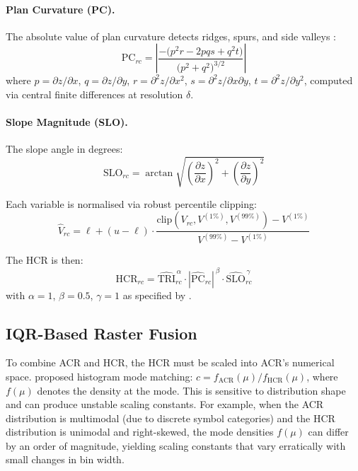 \documentclass[11pt,a4paper]{article}
\begin{document}
\paragraph{Plan Curvature (PC).}
The absolute value of plan curvature detects ridges, spurs, and side valleys \citep{zevenbergen1987}:
\begin{equation}
  \text{PC}_{rc} = \left| \frac{-\bigl(p^2 r - 2pqs + q^2 t\bigr)}{\bigl(p^2 + q^2\bigr)^{3/2}} \right|
  \label{eq:pc}
\end{equation}
where $p = \partial z / \partial x$, $q = \partial z / \partial y$, $r = \partial^2 z / \partial x^2$, $s = \partial^2 z / \partial x \partial y$, $t = \partial^2 z / \partial y^2$, computed via central finite differences at resolution $\delta$.

\paragraph{Slope Magnitude (SLO).}
The slope angle in degrees:
\begin{equation}
  \text{SLO}_{rc} = \arctan\!\sqrt{\left(\frac{\partial z}{\partial x}\right)^2 + \left(\frac{\partial z}{\partial y}\right)^2}
  \label{eq:slo}
\end{equation}

Each variable is normalised via robust percentile clipping:
\begin{equation}
  \hat{V}_{rc} = \ell + (u - \ell) \cdot \frac{\text{clip}(V_{rc}, V^{(1\%)}, V^{(99\%)}) - V^{(1\%)}}{V^{(99\%)} - V^{(1\%)}}
  \label{eq:norm}
\end{equation}

The HCR is then:
\begin{equation}
  \text{HCR}_{rc} = \widehat{\text{TRI}}_{rc}^{\,\alpha} \cdot |\widehat{\text{PC}}_{rc}|^{\,\beta} \cdot \widehat{\text{SLO}}_{rc}^{\,\gamma}
  \label{eq:hcr}
\end{equation}
with $\alpha = 1$, $\beta = 0.5$, $\gamma = 1$ as specified by \citet{ica2021lcp}.

\subsection{IQR-Based Raster Fusion}
\label{sec:iqr}

To combine ACR and HCR, the HCR must be scaled into ACR's numerical space.
\citet{ica2021lcp} proposed histogram mode matching: $c = f_{\text{ACR}}(\mu) / f_{\text{HCR}}(\mu)$, where $f(\mu)$ denotes the density at the mode.
This is sensitive to distribution shape and can produce unstable scaling constants.
For example, when the ACR distribution is multimodal (due to discrete symbol categories) and the HCR distribution is unimodal and right-skewed, the mode densities $f(\mu)$ can differ by an order of magnitude, yielding scaling constants that vary erratically with small changes in bin width.
\end{document}
